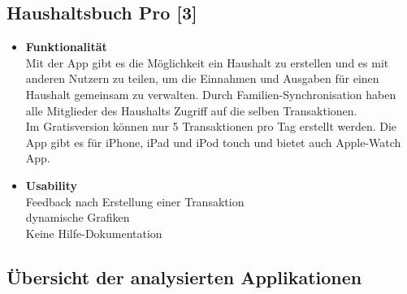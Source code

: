 \documentclass[runningheads,a4paper]{llncs}
\begin{document}
\clearpage

\subsection{Haushaltsbuch Pro [3]}
\begin{itemize} 

\item\textbf{Funktionalität}\\
Mit der App gibt es die Möglichkeit ein Haushalt zu erstellen und es mit anderen Nutzern zu teilen, um die Einnahmen und Ausgaben für einen Haushalt gemeinsam zu verwalten. Durch Familien-Synchronisation haben alle Mitglieder des Haushalts Zugriff auf die selben Transaktionen. \\
Im Gratisversion können nur 5 Transaktionen pro Tag erstellt werden. Die App gibt es für iPhone, iPad und iPod touch und bietet auch Apple-Watch App.\\

\item\textbf{Usability}\\

\textcolor{green}{}	Feedback nach Erstellung einer Transaktion\\
\textcolor{green}{}	dynamische Grafiken\\
\textcolor{red}{}	Keine Hilfe-Dokumentation\\

\end{itemize}

\begin{figure}
\centering
{}
\end{figure}
\clearpage


\subsection{Übersicht der analysierten Applikationen}
\end{document}

